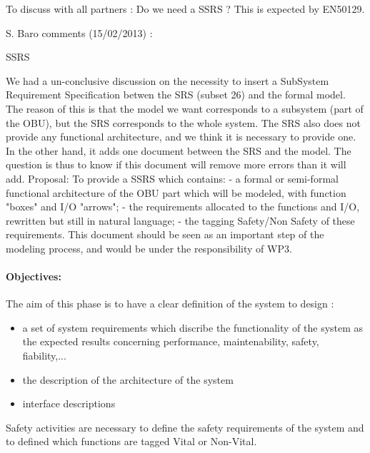 \begin{issue}
To discuss with all partners :  Do we need a SSRS ? This is expected by EN50129.

S. Baro comments (15/02/2013) :

SSRS

We had a un-conclusive discussion on the necessity to insert a SubSystem Requirement Specification betwen the SRS (subset 26) and the formal model. The reason of this is that the model we want corresponds to a subsystem (part of the OBU), but the SRS corresponds to the whole system. The SRS also does not provide any functional architecture, and we think it is necessary to provide one. In the other hand, it adds one document between the SRS and the model. The question is thus to know if this document will remove more errors than it will add.
Proposal: To provide a SSRS which contains:
- a formal or semi-formal functional architecture of the OBU part which will be modeled, with function "boxes" and I/O "arrows";
- the requirements allocated to the functions and I/O, rewritten but still in natural language;
- the tagging Safety/Non Safety of these requirements.
This document should be seen as an important step of the modeling process, and would be under the responsibility of WP3.
 

\end{issue}

\paragraph{Objectives:}
\label{sec:sys-dev-objective}
The aim of this phase is to have a clear definition of the system to design :

\begin{itemize}
\item a set of system requirements which discribe the functionality of the system as the expected results concerning performance, maintenability, safety, fiability,...
\item the description of the architecture of the system 
\item interface descriptions
\end{itemize}


Safety activities are necessary to define the safety requirements of the system and to defined which functions are tagged Vital or Non-Vital.

